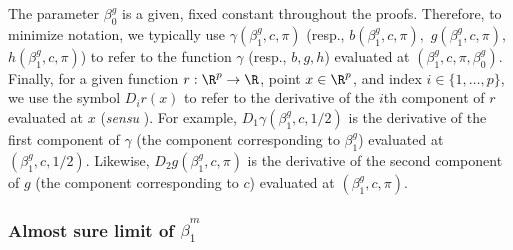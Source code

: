 \documentclass[12pt]{article}
\begin{document}
The parameter $\beta^g_0$ is a given, fixed constant throughout the proofs. Therefore, to minimize notation, we typically use $\gamma(\beta^g_1, c, \pi)$ (resp., $b(\beta^g_1, c, \pi),$ $g(\beta^g_1, c, \pi),$ $h(\beta^g_1, c, \pi)$) to refer to the function $\gamma$ (resp., $b, g, h$) evaluated at $(\beta^g_1, c, \pi, \beta^g_0)$. Finally, for a given function $r: \R^{p} \to \R$, point $x \in \R^p$, and index $i \in \{1, \dots, p\}$, we use the symbol $D_i r(x)$ to refer to the derivative of the $i$th component of $r$ evaluated at $x$ (\textit{sensu} \cite{fitzpatrick2009}). For example, $D_1 \gamma(\beta^g_1, c, 1/2)$ is the derivative of the first component of $\gamma$ (the component corresponding to $\beta^g_1$) evaluated at $(\beta^g_1, c, 1/2)$. Likewise,  $D_2g(\beta^g_1, c, \pi)$ is the derivative of the second component of $g$ (the component corresponding to $c$) evaluated at $(\beta^g_1, c, \pi).$

\subsubsection{Almost sure limit of $\hat{\beta}^m_1$}\label{sec:convergence}
\end{document}
